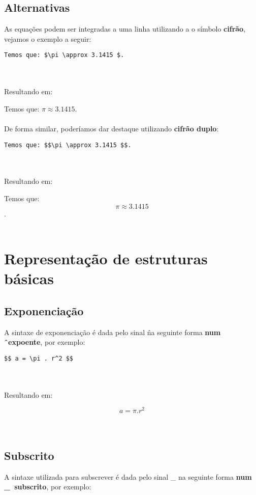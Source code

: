 \documentclass[12pt,a4paper]{article}
\begin{document}
\subsection{Alternativas}

As equações podem ser integradas a uma linha utilizando a o símbolo \textbf{cifrão}, vejamos o exemplo a seguir:

\begin{BVerbatim}
Temos que: $\pi \approx 3.1415 $.
\end{BVerbatim}
\\
\\
Resultando em: 

Temos que: $\pi \approx 3.1415 $.
\\
\\
De forma similar, poderíamos dar destaque utilizando \textbf{cifrão duplo}:


\begin{BVerbatim}
Temos que: $$\pi \approx 3.1415 $$.
\end{BVerbatim}
\\
\\
Resultando em: 

Temos que: $$\pi \approx 3.1415 $$.
\\
\\

\section{Representação de estruturas básicas}
\subsection{Exponenciação}

A sintaxe de exponenciação é dada pelo sinal \^ na seguinte forma \textbf{num \^\ expoente}, por exemplo:

\begin{BVerbatim}
$$ a = \pi . r^2 $$ 
\end{BVerbatim}
\\
\\
Resultando em: 

$$ a = \pi . r^2 $$ 
\\
\\

\subsection{Subscrito}

A sintaxe utilizada para subscrever é dada pelo sinal \_ na seguinte forma \textbf{num \_\ subscrito}, por exemplo:
\end{document}
